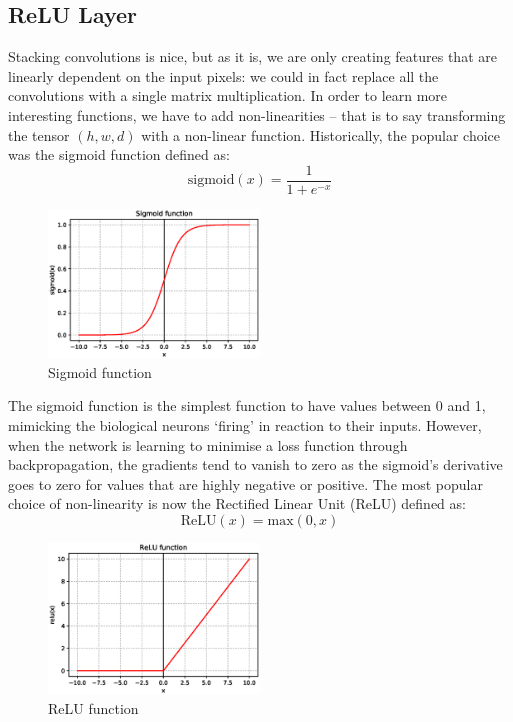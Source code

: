 \subsection{ReLU Layer}
Stacking convolutions is nice, but as it is, we are only creating features that are linearly dependent on the input pixels: we could in fact replace all the convolutions with a single matrix multiplication. In order to learn more interesting functions, we have to add non-linearities -- that is to say transforming the tensor $(h,w,d)$ with a non-linear function. Historically, the popular choice was the sigmoid function defined as:
\begin{equation}
\text{sigmoid}(x) = \frac{1}{1+e^{-x}}
\end{equation}

\begin{figure}[H]
\centering
\includegraphics[width=0.5\textwidth]{Images/sigmoid.eps}
\caption{Sigmoid function}
\end{figure}

The sigmoid function is the simplest function to have values between 0 and 1, mimicking the biological neurons `firing' in reaction to their inputs. However, when the network is learning to minimise a loss function through backpropagation, the gradients tend to vanish to zero as the sigmoid's derivative goes to zero for values that are highly negative or positive. The most popular choice of non-linearity is now the Rectified Linear Unit (ReLU) \cite{nair} defined as:
\begin{equation}
\text{ReLU}(x) = \text{max}(0,x)
\end{equation}

\begin{figure}[H]
\centering
\includegraphics[width=0.5\textwidth]{Images/relu.eps}
\caption{ReLU function}
\end{figure}

